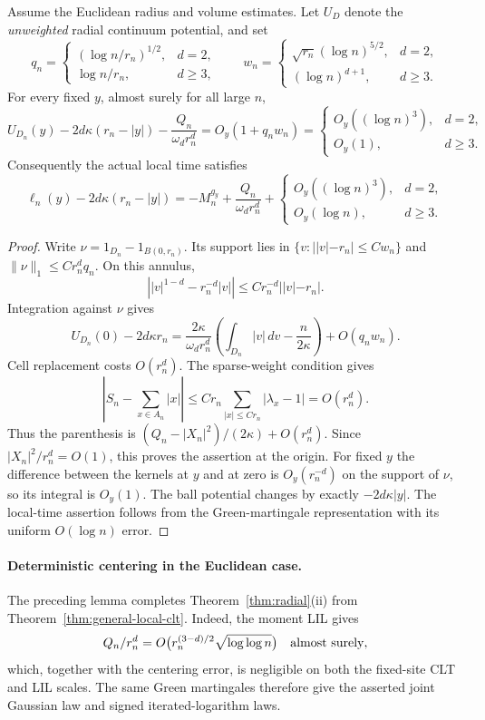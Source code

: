 \begin{lemma}
Assume the Euclidean radius and volume estimates. Let $U_D$ denote the
\emph{unweighted} radial continuum potential, and set
\[
 q_n=\begin{cases}(\log n/r_n)^{1/2},&d=2,\\\log n/r_n,&d\ge3,
 \end{cases}\qquad
 w_n=\begin{cases}\sqrt{r_n}(\log n)^{5/2},&d=2,\\(\log n)^{d+1},&d\ge3.
 \end{cases}
\]
For every fixed $y$, almost surely for all large $n$,
\[
 U_{D_n}(y)-2d\kappa(r_n-|y|)-\frac{Q_n}{\omega_dr_n^d}
 =O_y(1+q_nw_n)
 =\begin{cases}O_y((\log n)^3),&d=2,\\O_y(1),&d\ge3.
 \end{cases}
\]
Consequently the actual local time satisfies
\[
 \ell_n(y)-2d\kappa(r_n-|y|)
 =-M_n^{g_y}+\frac{Q_n}{\omega_dr_n^d}
   +\begin{cases}O_y((\log n)^3),&d=2,\\O_y(\log n),&d\ge3.
   \end{cases}
\]
\end{lemma}
\begin{proof}
Write $\nu=1_{D_n}-1_{B(0,r_n)}$. Its support lies in
$\{v:||v|-r_n|\le Cw_n\}$ and $\|\nu\|_1\le Cr_n^dq_n$.
On this annulus,
\[
 \left||v|^{1-d}-r_n^{-d}|v|\right|
 \le Cr_n^{-d}||v|-r_n|.
\]
Integration against $\nu$ gives
\[
 U_{D_n}(0)-2d\kappa r_n
 =\frac{2\kappa}{\omega_dr_n^d}
   \left(\int_{D_n}|v|\,dv-\frac n{2\kappa}\right)+O(q_nw_n).
\]
Cell replacement costs $O(r_n^d)$. The sparse-weight condition gives
\[
 \left|S_n-\sum_{x\in A_n}|x|\right|
 \le Cr_n\sum_{|x|\le Cr_n}|\lambda_x-1|=O(r_n^d).
\]
Thus the parenthesis is $(Q_n-|X_n|^2)/(2\kappa)+O(r_n^d)$.
Since $|X_n|^2/r_n^d=O(1)$, this proves the assertion at the origin.
For fixed $y$ the difference between the kernels at $y$ and at zero
is $O_y(r_n^{-d})$ on the support of $\nu$, so its integral is $O_y(1)$.
The ball potential changes by exactly $-2d\kappa|y|$.
The local-time assertion follows from the Green-martingale
representation with its uniform $O(\log n)$ error.
\end{proof}

\paragraph{Deterministic centering in the Euclidean case.}
The preceding lemma completes Theorem~\ref{thm:radial}\textup{(ii)}
from Theorem~\ref{thm:general-local-clt}. Indeed, the moment LIL gives
\[
 Q_n/r_n^d=O\bigl(r_n^{(3-d)/2}\sqrt{\log\log n}\bigr)
 \quad\hbox{almost surely},
\]
which, together with the centering error, is negligible on both the
fixed-site CLT and LIL scales. The same Green martingales therefore
give the asserted joint Gaussian law and signed iterated-logarithm laws.
